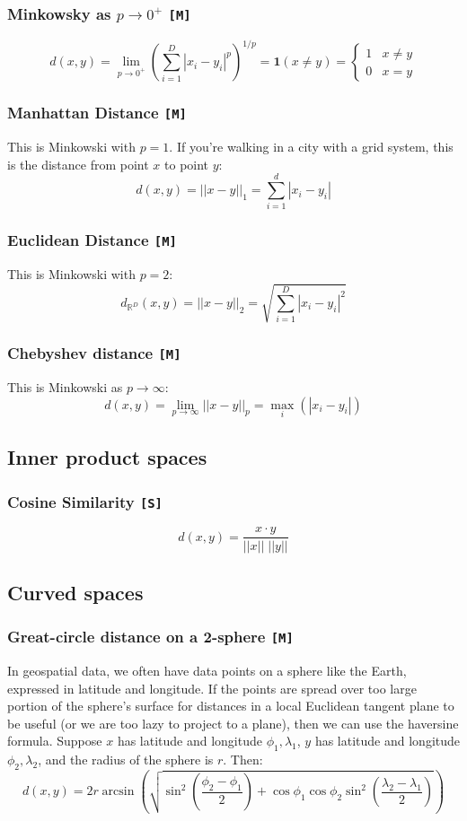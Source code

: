 \documentclass[12pt,a4paper]{article}
\newcommand{\x}{\cdot}
\newcommand{\1}[1]{\mathds{1}\left[#1\right]}
\newcommand{\R}{\mathbb{R}}
\newcommand{\B}[1]{\mathbf{#1}}
\begin{document}
\subsubsection{Minkowsky as $p\to0^+$ \texttt{[M]}}
\[d(x,y)=\lim_{p\to 0^+}\left(\sum_{i=1}^D|x_i-y_i|^p\right)^{1/p}=\B 1(x\neq y)=\begin{cases}1 & x\neq y\\0 & x= y\end{cases}\]
\subsubsection{Manhattan Distance \texttt{[M]}}\label{sec:L1}
This is Minkowski with $p=1$. If you're walking in a city with a grid system, this is the distance from point $x$ to point $y$:
\[d(x,y)=||x-y||_1=\sum_{i=1}^d|x_i-y_i|\]

\subsubsection{Euclidean Distance \texttt{[M]}}\label{sec:L2}
This is Minkowski with $p=2$:
\[d_{\R^D}(x,y)=||x-y||_2=\sqrt{\sum_{i=1}^D|x_i-y_i|^2}\]
\subsubsection{Chebyshev distance \texttt{[M]}}
This is Minkowski as $p\to \infty$:
\[d(x,y)=\lim_{p\to\infty}||x-y||_p=\max_i(|x_i-y_i|)\]

\subsection{Inner product spaces}
\subsubsection{Cosine Similarity \texttt{[S]}}
\[d(x,y)=\frac{x\x y}{||x||\;||y||}\]

\subsection{Curved spaces}

\subsubsection{Great-circle distance on a 2-sphere \texttt{[M]}}
In geospatial data, we often have data points on a sphere like the Earth, expressed in latitude and longitude. If the points are spread over too large portion of the sphere's surface for distances in a local Euclidean tangent plane to be useful (or we are too lazy to project to a plane), then we can use the haversine formula. Suppose $x$ has latitude and longitude $\phi_1,\lambda_1$, $y$ has latitude and longitude $\phi_2,\lambda_2$, and the radius of the sphere is $r$. Then: \cite{haversine}
\[d(x,y)=2r\arcsin \left(\sqrt{\sin^2\left(\frac{\phi_2-\phi_1}{2}\right)+\cos\phi_1\cos\phi_2\sin^2\left(\frac{\lambda_2-\lambda_1}{2}\right)}\right)\]
\end{document}
